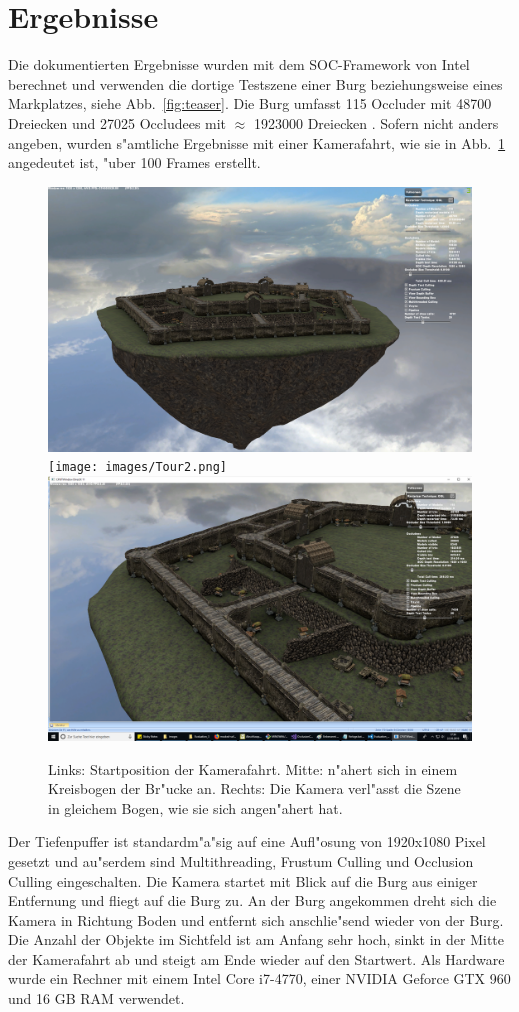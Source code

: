 \documentclass[journal]{vgtc}
\begin{document}
\section{Ergebnisse}
Die dokumentierten Ergebnisse wurden mit dem SOC-Framework von Intel berechnet und verwenden die dortige Testszene einer Burg beziehungsweise eines Markplatzes, siehe Abb.\ \ref{fig:teaser}.
Die Burg umfasst 115 Occluder mit 48700 Dreiecken und 27025 Occludees mit $\approx$ 1923000 Dreiecken \cite{MSOC}. Sofern nicht anders angeben, wurden s"amtliche Ergebnisse mit einer Kamerafahrt, wie sie in Abb.\ \ref{fig:fahrt} angedeutet ist, "uber 100 Frames erstellt.
\begin{figure}%
\includegraphics[width=0.33\columnwidth]{images/Tour1.png}%
\texttt{[image: images/Tour2.png]}%
\includegraphics[width=0.33\columnwidth]{images/Tour3.png}%
\caption{Links: Startposition der Kamerafahrt. Mitte: n"ahert sich in einem Kreisbogen der Br"ucke an. Rechts: Die Kamera verl"asst die Szene in gleichem Bogen, wie sie sich angen"ahert hat.}%
\label{fig:fahrt}%
\end{figure}
Der Tiefenpuffer ist standardm"a"sig auf eine Aufl"osung von 1920x1080 Pixel gesetzt und au"serdem sind Multithreading, Frustum Culling und Occlusion Culling eingeschalten.
Die Kamera startet mit Blick auf die Burg aus einiger Entfernung und fliegt auf die Burg zu.
An der Burg angekommen dreht sich die Kamera in Richtung Boden und entfernt sich anschlie"send wieder von der Burg.
Die Anzahl der Objekte im Sichtfeld ist am Anfang sehr hoch, sinkt in der Mitte der Kamerafahrt ab und steigt am Ende wieder auf den Startwert.
Als Hardware wurde ein Rechner mit einem Intel Core i7-4770, einer NVIDIA Geforce GTX 960 und 16 GB RAM verwendet.\\
\end{document}
